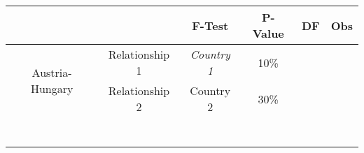 \documentclass[onesided]{article}\usepackage[]{graphicx}\usepackage[]{color}
\begin{document}
\begin{table}[]
\begin{tabular}{ccccll}
\cline{2-6}
\multicolumn{1}{c|}{}                            & \multicolumn{1}{c|}{}                        & \multicolumn{1}{c|}{\textbf{F-Test}}    & \multicolumn{1}{c|}{P-Value} & \multicolumn{1}{l|}{DF} & \multicolumn{1}{l|}{Obs} \\ \hline
\multicolumn{1}{|c|}{\multirow{2}{*}{Austria-Hungary}} & \multicolumn{1}{c|}{Relationship 1} & \multicolumn{1}{c|}{\textit{Country 1}} & \multicolumn{1}{c|}{10\%}    & \multicolumn{1}{l|}{}   & \multicolumn{1}{l|}{}    \\ \cline{2-6} 
\multicolumn{1}{|c|}{}                           & \multicolumn{1}{c|}{Relationship 2}          & \multicolumn{1}{c|}{Country 2}          & \multicolumn{1}{c|}{30\%}    & \multicolumn{1}{l|}{}   & \multicolumn{1}{l|}{}    \\ \hline
                                                 &                                              &                                         &                              &                         &                          \\
                                                 &                                              &                                         &                              &                         &                          \\
                                                 &                                              &                                         &                              &                         &                          \\
                                                 &                                              &                                         &                              &                         &                          \\
                                                 &                                              &                                         &                              &                         &                          \\
                                                 &                                              &                                         &                              &                         &                          \\
                                                 &                                              &                                         &                              &                         &                          \\

\end{tabular}
\end{table}
\end{document}
